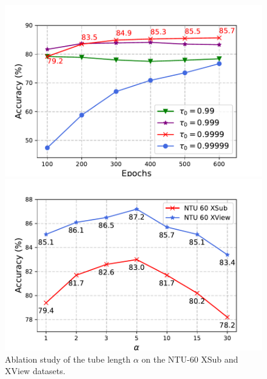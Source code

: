 \begin{figure}[tb]
  \begin{minipage}[b]{0.48\linewidth}
    \centering
    \includegraphics[width=0.75\linewidth]{figures/ema_ablation.pdf}
    \caption{
      Ablation study of EMA parameter $\tau_{0}$ on the NTU-60 XSub dataset
      under linear protocol.
      }
    \label{fig:ema_ablation}
  \end{minipage}
  \hfill
  \begin{minipage}[b]{0.48\linewidth}
    \centering
    \includegraphics[width=0.75\linewidth]{figures/alpha_ablation.pdf}
    \caption{
      Ablation study of the tube length $\alpha$ on the NTU-60 XSub and XView datasets.
      }
    \label{fig:alpha_ablation}
  \end{minipage}
  \vspace{-14pt}
\end{figure}

